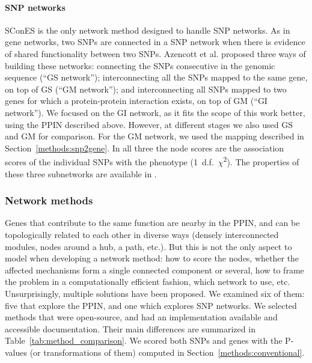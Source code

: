 \documentclass[10pt,letterpaper]{article}
\begin{document}
\paragraph{SNP networks}
SConES \cite{azencott_efficient_2013} is the only network method designed to handle SNP networks. As in gene networks, two SNPs are connected in a SNP network when there is evidence of shared functionality between two SNPs. Azencott et al. \cite{azencott_efficient_2013} proposed three ways of building these networks: connecting the SNPs consecutive in the genomic sequence (``GS network''); interconnecting all the SNPs mapped to the same gene, on top of GS (``GM network''); and interconnecting all SNPs mapped to two genes for which a protein-protein interaction exists, on top of GM (``GI network''). We focused on the GI network, as it fits the scope of this work better, using the PPIN described above. However, at different stages we also used GS and GM for comparison. For the GM network, we used the mapping described in Section~\ref{methods:snp2gene}. In all three the node scores are the association scores of the individual SNPs with the phenotype (1~d.f.~\(\chi\)\textsuperscript{2}). The properties of these three subnetworks are available in .

\subsubsection{Network methods}
\label{methods:methods}

Genes that contribute to the same function are nearby in the PPIN, and can be topologically related to each other in diverse ways (densely interconnected modules, nodes around a hub, a path, etc.). But this is not the only aspect to model when developing a network method: how to score the nodes, whether the affected mechanisms form a single connected component or several, how to frame the problem in a computationally efficient fashion, which network to use, etc. Unsurprisingly, multiple solutions have been proposed. We examined six of them: five that explore the PPIN, and one which explores SNP networks. We selected methods that were open-source, and had an implementation available and accessible documentation. Their main differences are summarized in Table~\ref{tab:method_comparison}. We scored both SNPs and genes with the P-values (or transformations of them) computed in Section~\ref{methods:conventional}.
\end{document}
